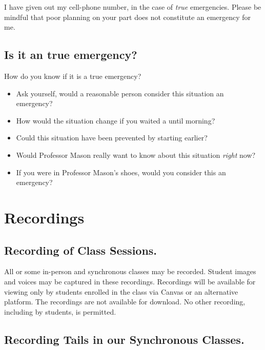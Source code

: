 \documentclass[
]{book}
\providecommand{\tightlist}{%
  \setlength{\itemsep}{0pt}\setlength{\parskip}{0pt}}
\begin{document}
I have given out my cell-phone number, in the case of \emph{true} emergencies. Please be mindful that poor planning on your part does not constitute an emergency for me.

\hypertarget{is-it-an-true-emergency}{%
\subsection{Is it an true emergency?}\label{is-it-an-true-emergency}}

How do you know if it is a true emergency?

\begin{itemize}
\tightlist
\item
  Ask yourself, would a reasonable person consider this situation an emergency?
\item
  How would the situation change if you waited a until morning?
\item
  Could this situation have been prevented by starting earlier?
\item
  Would Professor Mason really want to know about this situation \emph{right} now?
\item
  If you were in Professor Mason's shoes, would you consider this an emergency?
\end{itemize}

\hypertarget{recordings}{%
\section{Recordings}\label{recordings}}

\hypertarget{recording-of-class-sessions.}{%
\subsection{Recording of Class Sessions.}\label{recording-of-class-sessions.}}

All or some in-person and synchronous classes may be recorded. Student images and voices may be captured in these recordings. Recordings will be available for viewing only by students enrolled in the class via Canvas or an alternative platform. The recordings are not available for download. No other recording, including by students, is permitted.

\hypertarget{recording-tails-in-our-synchronous-classes.}{%
\subsection{Recording Tails in our Synchronous Classes.}\label{recording-tails-in-our-synchronous-classes.}}
\end{document}
